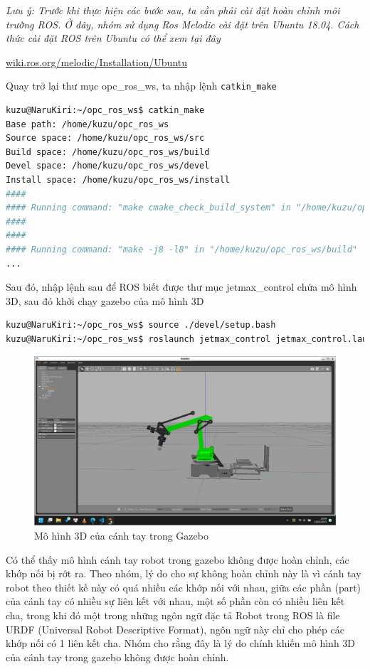 \textit{Lưu ý: Trước khi thực hiện các bước sau, ta cần phải cài đặt hoàn chỉnh môi trường ROS. Ở đây, nhóm sử dụng Ros Melodic cài đặt trên Ubuntu 18.04. Cách thức cài đặt ROS trên Ubuntu có thể xem tại đây}

\href{https://wiki.ros.org/melodic/Installation/Ubuntu}{wiki.ros.org/melodic/Installation/Ubuntu}


Quay trở lại thư mục opc\_ros\_ws, ta nhập lệnh \lstinline{catkin_make}
\begin{lstlisting}[language=bash]  
kuzu@NaruKiri:~/opc_ros_ws$ catkin_make
Base path: /home/kuzu/opc_ros_ws
Source space: /home/kuzu/opc_ros_ws/src
Build space: /home/kuzu/opc_ros_ws/build
Devel space: /home/kuzu/opc_ros_ws/devel
Install space: /home/kuzu/opc_ros_ws/install
####
#### Running command: "make cmake_check_build_system" in "/home/kuzu/opc_ros_ws/build"
####
####
#### Running command: "make -j8 -l8" in "/home/kuzu/opc_ros_ws/build"
...
\end{lstlisting}

Sau đó, nhập lệnh sau để ROS biết được thư mục jetmax\_control chứa mô hình 3D, sau đó khởi chạy gazebo của mô hình 3D

\begin{lstlisting}[language=bash]
kuzu@NaruKiri:~/opc_ros_ws$ source ./devel/setup.bash
kuzu@NaruKiri:~/opc_ros_ws$ roslaunch jetmax_control jetmax_control.launch 
\end{lstlisting}

\begin{figure}[H]
    \centering
    \includegraphics[width=1\textwidth]{Images/Implementation/VRapp/model3d_2.jpg}
    \caption{Mô hình 3D của cánh tay trong Gazebo}
    \label{fig:model3d_2}
\end{figure}

Có thể thấy mô hình cánh tay robot trong gazebo không được hoàn chỉnh, các khớp nối bị rớt ra. Theo nhóm, lý do cho sự không hoàn chỉnh này là vì cánh tay robot theo thiết kế này có quá nhiều các khớp nối với nhau, giữa các phần (part) của cánh tay có nhiều sự liên kết với nhau, một số phần còn có nhiều liên kết cha, trong khi đó một trong những ngôn ngữ đặc tả Robot trong ROS là file URDF (Universal Robot Descriptive Format), ngôn ngữ này chỉ cho phép các khớp nối có 1 liên kết cha. Nhóm cho rằng đây là lý do chính khiến mô hình 3D của cánh tay trong gazebo không được hoàn chỉnh.

